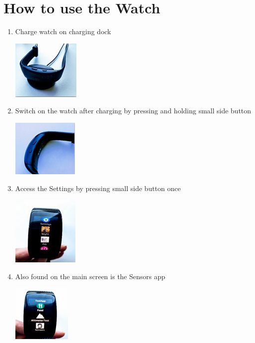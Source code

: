 \documentclass[12pt, a4paper]{article}
\begin{document}
\cleardoublepage
\section{How to use the Watch}
\begin{enumerate}
  \item Charge watch on charging dock
  \begin{center}
    \includegraphics[width=.35\textwidth]{Pic 3.png}
\end{center}
  \item Switch on the watch after charging by pressing and holding small side button
    \begin{center}
    \includegraphics[width=.35\textwidth]{Pic 4.png}
\end{center}
  \item Access the Settings by pressing small side button once
    \begin{center}
    \includegraphics[width=.35\textwidth]{Pic 5.png}
\end{center}
\cleardoublepage
  \item Also found on the main screen is the Sensors app 
    \begin{center}
    \includegraphics[width=.35\textwidth]{Pic 6.png}

\end{center}
\end{enumerate}
\end{document}
